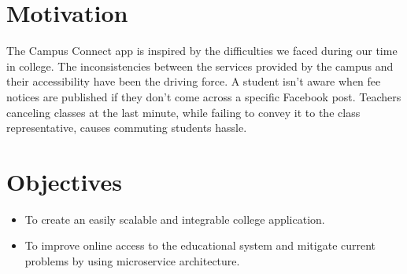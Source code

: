 \section{Motivation}
The Campus Connect app is inspired by the difficulties we faced during our time in college. The inconsistencies between the services provided by the campus and their accessibility have been the driving force. A student isn’t aware when fee notices are published if they don’t come across a specific Facebook post. Teachers canceling classes at the last minute, while failing to convey it to the class representative, causes commuting students hassle.

\section{Objectives}
\begin{itemize}
    \item To create an easily scalable and integrable college application.
    \item To improve online access to the educational system and mitigate current problems by using microservice architecture.
\end{itemize}